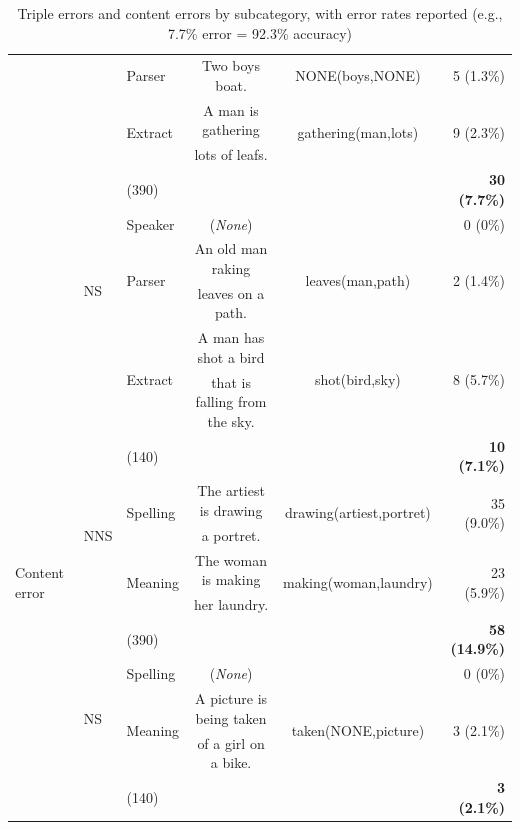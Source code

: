 \begin{table}[htb!]
\begin{center}
\begin{tabular}{|l|l|l|cc|r|}
  \cline{3-6}
  & & Parser & Two boys boat. & NONE(boys,NONE) & 5 (1.3\%) \\
  \cline{3-6}
  & & \multirow{2}{*}{Extract} & A man is gathering & \multirow{2}{*}{gathering(man,lots)} & \multirow{2}{*}{9 (2.3\%)} \\
  & & & lots of leafs. & & \\
  \cline{3-6}
  & & (390) & & & \textbf{30 (7.7\%)} \\
 \cline{2-6}
 & \multirow{4}{*}{\begin{sideways}NS\end{sideways}} & Speaker & (\textit{None}) & & 0 (0\%) \\
 \cline{3-6}
 & & \multirow{2}{*}{Parser} & An old man raking & \multirow{2}{*}{leaves(man,path)} & \multirow{2}{*}{2 (1.4\%)} \\
  & & & leaves on a path. & & \\
 \cline{3-6}
 & & \multirow{2}{*}{Extract} & A man has shot a bird & \multirow{2}{*}{shot(bird,sky)} & \multirow{2}{*}{8 (5.7\%)} \\
 & & & that is falling from the sky. & & \\
 \cline{3-6}
 & & (140) & & & \textbf{10 (7.1\%)} \\
 \hline
 \hline
 \multirow{6}{*}{\begin{sideways}Content error\end{sideways}} & \multirow{3}{*}{\begin{sideways}NNS\end{sideways}} & \multirow{2}{*}{Spelling} & The artiest is drawing & \multirow{2}{*}{drawing(artiest,portret)} & \multirow{2}{*}{35 (9.0\%)} \\
   & & & a portret. & & \\
\cline{3-6}
  & & \multirow{2}{*}{Meaning} & The woman is making & \multirow{2}{*}{making(woman,laundry)} & \multirow{2}{*}{23 (5.9\%)} \\
& & & her laundry. & & \\
\cline{3-6}
  & & (390) & & & \textbf{58 (14.9\%)} \\
 \cline{2-6}
 & \multirow{3}{*}{\begin{sideways}NS\end{sideways}} & Spelling & (\textit{None}) & & 0 (0\%) \\
 \cline{3-6}
 & & \multirow{2}{*}{Meaning} & A picture is being taken & \multirow{2}{*}{taken(NONE,picture)} & \multirow{2}{*}{3 (2.1\%)} \\
  & & & of a girl on a bike. & & \\

 \cline{3-6}
 & & (140) & & & \textbf{3 (2.1\%)} \\
 \hline
\end{tabular}
\end{center}
\caption{Triple errors and content errors by subcategory, with error
  rates reported (e.g., 7.7\% error = 92.3\% accuracy)}
\label{tab:error-types}
\end{table}

